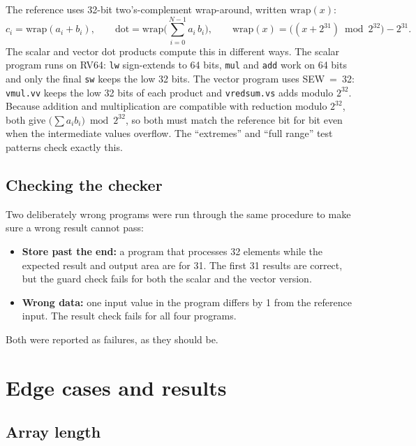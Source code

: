 \documentclass[11pt,a4paper]{article}
\newcommand{\code}[1]{\texttt{#1}}
\begin{document}
The reference uses 32-bit two's-complement wrap-around, written $\mathrm{wrap}(x)$:
\[
  c_i = \mathrm{wrap}(a_i + b_i), \qquad
  \text{dot} = \mathrm{wrap}\!\Big(\sum_{i=0}^{N-1} a_i\, b_i\Big), \qquad
  \mathrm{wrap}(x) = \big((x + 2^{31}) \bmod 2^{32}\big) - 2^{31}.
\]
The scalar and vector dot products compute this in different ways. The scalar program runs on
RV64: \code{lw} sign-extends to 64 bits, \code{mul} and \code{add} work on 64 bits and only the
final \code{sw} keeps the low 32 bits. The vector program uses SEW~=~32: \code{vmul.vv} keeps
the low 32 bits of each product and \code{vredsum.vs} adds modulo $2^{32}$. Because addition and
multiplication are compatible with reduction modulo $2^{32}$, both give
$\big(\sum a_i b_i\big) \bmod 2^{32}$, so both must match the reference bit for bit even when
the intermediate values overflow. The ``extremes'' and ``full range'' test patterns check
exactly this.

\subsection{Checking the checker}

Two deliberately wrong programs were run through the same procedure to make sure a wrong result
cannot pass:
\begin{itemize}
  \item \textbf{Store past the end:} a program that processes 32 elements while the expected
        result and output area are for 31. The first 31 results are correct, but the guard check
        fails for both the scalar and the vector version.
  \item \textbf{Wrong data:} one input value in the program differs by 1 from the reference
        input. The result check fails for all four programs.
\end{itemize}
Both were reported as failures, as they should be.

\section{Edge cases and results}

\subsection{Array length}
\end{document}

